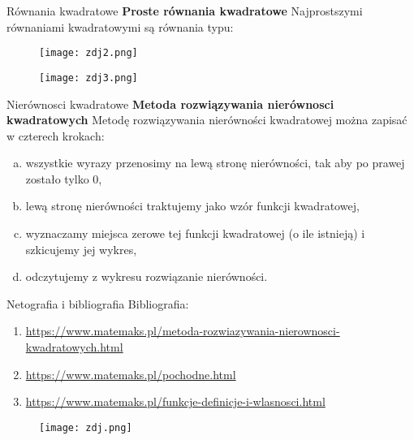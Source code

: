 \documentclass{beamer}
\begin{document}
\begin{frame}[t]{Równania kwadratowe}
\textbf{Proste równania kwadratowe}
\newline
Najprostszymi równaniami kwadratowymi są równania typu:
\begin{figure}[h!]
\texttt{[image: zdj2.png]}
\end{figure}
\begin{figure}[h!]
\texttt{[image: zdj3.png]}
\end{figure}
\end{frame}

\begin{frame}[t]{Nierównosci kwadratowe} \vspace{4pt}
\textbf{Metoda rozwiązywania nierównosci kwadratowych}
\newline
Metodę rozwiązywania nierówności kwadratowej można zapisać w czterech krokach:
\begin{enumerate} [a) ]
\item wszystkie wyrazy przenosimy na lewą stronę nierówności, tak aby po prawej zostało tylko 0,
\item lewą stronę nierówności traktujemy jako wzór funkcji kwadratowej,
\item wyznaczamy miejsca zerowe tej funkcji kwadratowej (o ile istnieją) i szkicujemy jej wykres,
\item odczytujemy z wykresu rozwiązanie nierówności.
\end{enumerate}
\end{frame}

\begin{frame}[t]{Netografia i bibliografia} \vspace{4pt}
Bibliografia:
\begin{enumerate} [1. ]
\item\url{https://www.matemaks.pl/metoda-rozwiazywania-nierownosci-kwadratowych.html}
\item\url{https://www.matemaks.pl/pochodne.html}
\item\url{https://www.matemaks.pl/funkcje-definicje-i-wlasnosci.html}
\end{enumerate}

\begin{figure}[h!]
\texttt{[image: zdj.png]}
\end{figure}

\end{frame}
\end{document}
